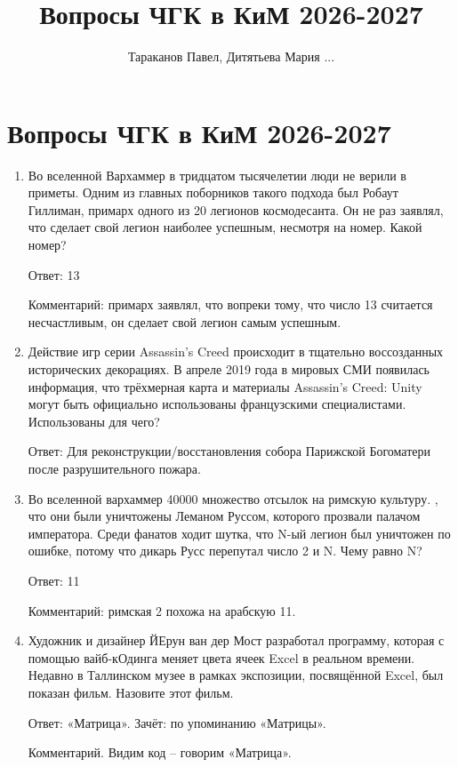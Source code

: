 \documentclass[oneside,final,14pt]{extreport}
\title{\textbf{Вопросы ЧГК в КиМ 2026-2027}}
\author{Тараканов Павел, Дитятьева Мария ...}
\begin{document}
\maketitle

\section*{Вопросы ЧГК в КиМ 2026-2027}
\begin{enumerate}
    \item Во вселенной Вархаммер в тридцатом тысячелетии люди не верили в приметы. Одним из главных поборников такого подхода был Робаут Гиллиман, примарх одного из 20 легионов космодесанта. Он не раз заявлял, что сделает свой легион наиболее успешным, несмотря на номер. Какой номер?

    Ответ: 13

    Комментарий: примарх заявлял, что вопреки тому, что число 13 считается несчастливым, он сделает свой легион самым успешным.

    \item Действие игр серии Assassin's Creed происходит в тщательно воссозданных исторических декорациях. В апреле 2019 года в мировых СМИ появилась информация, что трёхмерная карта и материалы Assassin's Creed: Unity могут быть официально использованы французскими специалистами. Использованы для чего?

    Ответ: Для реконструкции/восстановления собора Парижской Богоматери после разрушительного пожара.

    \item Во вселенной вархаммер 40000 множество отсылок на римскую культуру. , что они были уничтожены Леманом Руссом, которого прозвали палачом императора. Среди фанатов ходит шутка, что N-ый легион был уничтожен по ошибке, потому что дикарь Русс перепутал число 2 и N. Чему равно N?

    Ответ: 11

    Комментарий: римская 2 похожа на арабскую 11.

    \item Художник и дизайнер ЙЕрун ван дер Мост разработал программу, которая с помощью вайб-кОдинга меняет цвета ячеек Excel в реальном времени. Недавно в Таллинском музее в рамках экспозиции, посвящённой Excel, был показан фильм. Назовите этот фильм.

    Ответ: «Матрица». Зачёт: по упоминанию «Матрицы».

    Комментарий. Видим код – говорим «Матрица».


\end{enumerate}
\end{document}
